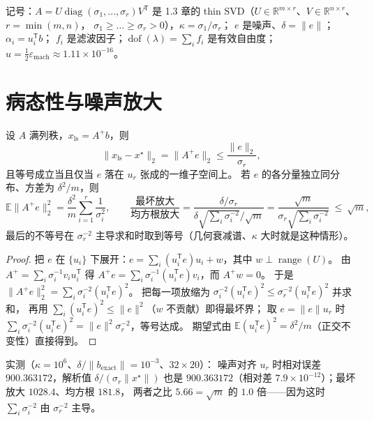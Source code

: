 记号：$A=U\operatorname{diag}(\sigma_1,\dots,\sigma_r)V^{\mathsf T}$ 是 1.3 章的
thin SVD（$U\in\mathbb{R}^{m\times r}$、$V\in\mathbb{R}^{n\times r}$、$r=\min(m,n)$，
$\sigma_1\ge\dots\ge\sigma_r>0$），$\kappa=\sigma_1/\sigma_r$；
$e$ 是噪声、$\delta=\lVert e\rVert$；$\alpha_i=u_i^{\mathsf T}b$；
$f_i$ 是滤波因子；$\operatorname{dof}(\lambda)=\sum_i f_i$ 是有效自由度；
$u=\tfrac12\varepsilon_{\text{mach}}\approx1.11\times10^{-16}$。

\section{病态性与噪声放大}

\begin{theorem}[最小二乘解的噪声放大与等号条件]
\label{thm:amplify}
设 $A$ 满列秩，$x_{\mathrm{ls}}=A^{+}b$，则
\[
  \lVert x_{\mathrm{ls}}-x^\star\rVert_2=\lVert A^{+}e\rVert_2
  \le \frac{\lVert e\rVert_2}{\sigma_r},
\]
且等号成立当且仅当 $e$ 落在 $u_r$ 张成的一维子空间上。
若 $e$ 的各分量独立同分布、方差为 $\delta^2/m$，则
\[
  \mathbb{E}\lVert A^{+}e\rVert_2^2=\frac{\delta^2}{m}\sum_{i=1}^{r}\frac{1}{\sigma_i^2},
  \qquad
  \frac{\text{最坏放大}}{\text{均方根放大}}
  =\frac{\delta/\sigma_r}{\delta\sqrt{\sum_i\sigma_i^{-2}}/\sqrt{m}}
  =\frac{\sqrt{m}}{\sigma_r\sqrt{\sum_i\sigma_i^{-2}}}\ \le\ \sqrt{m},
\]
最后的不等号在 $\sigma_r^{-2}$ 主导求和时取到等号（几何衰减谱、$\kappa$ 大时就是这种情形）。
\end{theorem}

\begin{proof}
把 $e$ 在 $\{u_i\}$ 下展开：$e=\sum_i (u_i^{\mathsf T}e)u_i+w$，其中 $w\perp\operatorname{range}(U)$。
由 $A^{+}=\sum_i \sigma_i^{-1}v_iu_i^{\mathsf T}$ 得
$A^{+}e=\sum_i \sigma_i^{-1}(u_i^{\mathsf T}e)v_i$，而 $A^{+}w=0$。
于是 $\lVert A^{+}e\rVert_2^2=\sum_i \sigma_i^{-2}(u_i^{\mathsf T}e)^2$。
把每一项放缩为 $\sigma_i^{-2}(u_i^{\mathsf T}e)^2\le\sigma_r^{-2}(u_i^{\mathsf T}e)^2$ 并求和，
再用 $\sum_i(u_i^{\mathsf T}e)^2\le\lVert e\rVert^2$（$w$ 不贡献）即得最坏界；
取 $e=\lVert e\rVert u_r$ 时 $\sum_i\sigma_i^{-2}(u_i^{\mathsf T}e)^2=\lVert e\rVert^2\sigma_r^{-2}$，等号达成。
期望式由 $\mathbb{E}(u_i^{\mathsf T}e)^2=\delta^2/m$（正交不变性）直接得到。
\end{proof}

实测（$\kappa=10^6$、$\delta/\lVert b_{\text{exact}}\rVert=10^{-3}$、$32\times20$）：
噪声对齐 $u_r$ 时相对误差 $900.363172$，解析值 $\delta/(\sigma_r\lVert x^\star\rVert)$ 也是
$900.363172$（相对差 $7.9\times10^{-12}$）；最坏放大 $1028.4$、均方根 $181.8$，
两者之比 $5.66=\sqrt{m}$ 的 $1.0$ 倍——因为这时 $\sum_i\sigma_i^{-2}$ 由 $\sigma_r^{-2}$ 主导。

